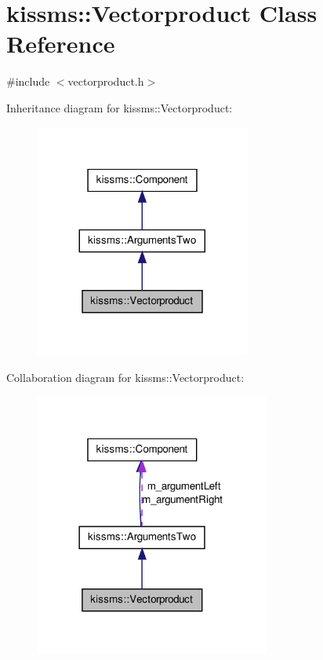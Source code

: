 \hypertarget{classkissms_1_1_vectorproduct}{\section{kissms\-:\-:Vectorproduct Class Reference}
\label{classkissms_1_1_vectorproduct}
}


{\ttfamily \#include $<$vectorproduct.\-h$>$}



Inheritance diagram for kissms\-:\-:Vectorproduct\-:
\nopagebreak
\begin{figure}[H]
\begin{center}
\leavevmode
\includegraphics[width=200pt]{classkissms_1_1_vectorproduct__inherit__graph}
\end{center}
\end{figure}


Collaboration diagram for kissms\-:\-:Vectorproduct\-:
\nopagebreak
\begin{figure}[H]
\begin{center}
\leavevmode
\includegraphics[width=218pt]{classkissms_1_1_vectorproduct__coll__graph}
\end{center}
\end{figure}

